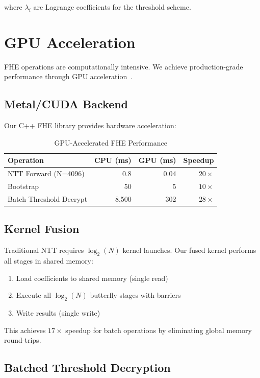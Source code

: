 \documentclass{../shared/luxfhe}
\begin{document}
where $\lambda_i$ are Lagrange coefficients for the threshold scheme.

\section{GPU Acceleration}

FHE operations are computationally intensive. We achieve production-grade performance through GPU acceleration~\cite{luxcpp-fhe,gpu-fhe}.

\subsection{Metal/CUDA Backend}

Our C++ FHE library provides hardware acceleration:

\begin{table}[h]
\centering
\caption{GPU-Accelerated FHE Performance}
\begin{tabular}{lrrr}
\toprule
Operation & CPU (ms) & GPU (ms) & Speedup \\
\midrule
NTT Forward (N=4096) & 0.8 & 0.04 & $20\times$ \\
Bootstrap & 50 & 5 & $10\times$ \\
Batch Threshold Decrypt & 8,500 & 302 & $28\times$ \\
\bottomrule
\end{tabular}
\end{table}

\subsection{Kernel Fusion}

Traditional NTT requires $\log_2(N)$ kernel launches. Our fused kernel performs all stages in shared memory:

\begin{enumerate}
    \item Load coefficients to shared memory (single read)
    \item Execute all $\log_2(N)$ butterfly stages with barriers
    \item Write results (single write)
\end{enumerate}

This achieves $17\times$ speedup for batch operations by eliminating global memory round-trips.

\subsection{Batched Threshold Decryption}
\end{document}
